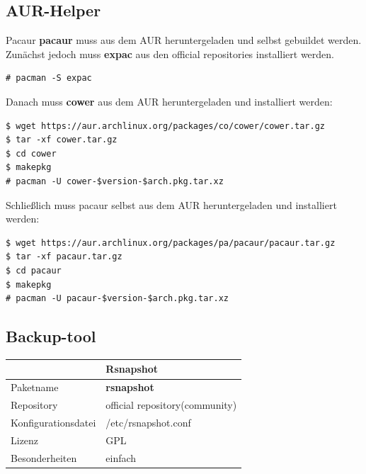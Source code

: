 \graphicspath{ {programme/images/} }








\subsection{AUR-Helper}
Pacaur \textbf{pacaur} muss aus dem AUR heruntergeladen und selbst gebuildet werden.
Zunächst jedoch muss \textbf{expac} aus den official repositories installiert werden.
\begin{lstlisting}[style=Bash]
# pacman -S expac
\end{lstlisting}
Danach muss \textbf{cower} aus dem AUR heruntergeladen und installiert werden:
\begin{lstlisting}[style=Bash]
$ wget https://aur.archlinux.org/packages/co/cower/cower.tar.gz
$ tar -xf cower.tar.gz
$ cd cower
$ makepkg
# pacman -U cower-$version-$arch.pkg.tar.xz
\end{lstlisting}
Schließlich muss pacaur selbst aus dem AUR heruntergeladen und installiert werden:
\begin{lstlisting}[style=Bash]
$ wget https://aur.archlinux.org/packages/pa/pacaur/pacaur.tar.gz
$ tar -xf pacaur.tar.gz
$ cd pacaur
$ makepkg
# pacman -U pacaur-$version-$arch.pkg.tar.xz
\end{lstlisting}

\subsection{Backup-tool}
\begin{tabular}{l|l}
~ & Rsnapshot \\ \hline
Paketname & \textbf{rsnapshot} \\ 
Repository & official repository(community) \\
Konfigurationsdatei & /etc/rsnapshot.conf \\
Lizenz & GPL \\
Besonderheiten & einfach \\
\end{tabular}
\\ \\

